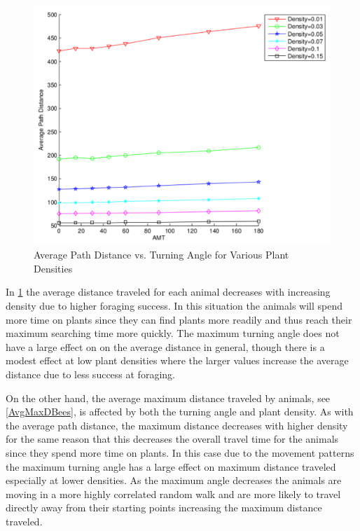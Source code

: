 \begin{figure}
  \begin{center}
  \includegraphics[scale=0.5]{Figures/PathVsAMT.pdf}
  \end{center}
  \caption{\small Average Path Distance vs. Turning Angle for Various Plant
    Densities}
  \label{AvgPathN}
\end{figure}

In \cref{AvgPathN} the average distance traveled for each animal decreases
with increasing density due to higher foraging success.  In this situation the
animals will spend more time on plants since they can find plants more readily
and thus reach their maximum searching time more quickly.  The maximum turning
angle does not have a large effect on on the  average distance in general,
though there is a modest effect at low plant densities where the larger values
increase the average distance due to less success at foraging.

On the other hand, the average maximum distance traveled by animals, see
\cref{AvgMaxDBees}, is affected by both the turning angle and plant density.
As with the average path distance, the maximum distance decreases with higher
density for the same reason that this decreases the overall travel time for the
animals since they spend more time on plants.  In this case due to the movement
patterns the maximum turning angle has a large effect on maximum distance
traveled especially at lower densities.  As the maximum angle decreases the
animals are moving in a more highly correlated random walk and are more likely
to travel directly away from their starting points increasing the maximum
distance traveled.

